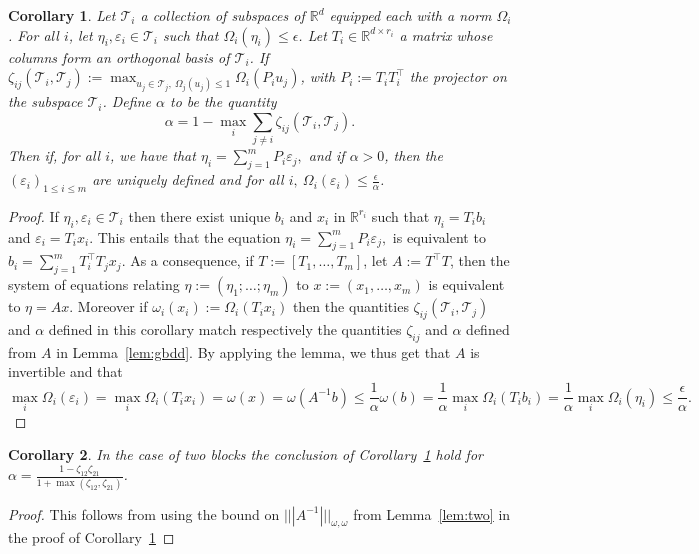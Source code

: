 \documentclass{article}
\def\RR{\mathbb{R}}
\def\T{\mathcal{T}}
\def\xxi{\zeta}
\newtheorem{cor}{Corollary}
\begin{document}
\begin{cor}
\label{cor:small_x}
Let $\T_i$ a collection of subspaces of $\RR^d$ equipped each with a norm $\Omega_i$. For all $i$, let $\eta_i,\varepsilon_i \in \T_i$ such that
$\Omega_i(\eta_i) \leq \epsilon$. Let $T_i \in \RR^{d \times r_i}$ a matrix whose columns form an orthogonal basis of $\T_i$.  If $\xxi_{ij}(\T_i,\T_j):=\max_{u_j \in \T_j,\: \Omega_j(u_j) \leq 1} \Omega_i(P_i u_j)$, with $P_i:=T_iT_i^\top$ the projector on the subspace $\T_i$. Define $\alpha$ to be the quantity
$$\alpha=1-\max_{i} \sum_{j\neq i} \xxi_{ij}(\T_i,\T_j).$$
Then if, for all $i$, we have that 
$\eta_i=\sum_{j=1}^m P_i\varepsilon_j,$
 and if $\alpha>0$, then the $(\varepsilon_i)_{1 \leq i \leq m}$ are uniquely defined and for all $i,\: \Omega_i(\varepsilon_i) \leq \frac{\epsilon}{\alpha}$.
\end{cor}
\begin{proof}
If $\eta_i, \varepsilon_i \in \T_i$ then there exist unique $b_i$ and $x_i$ in $\RR^{r_i}$ such that $\eta_i=T_i b_i$ and $\varepsilon_i=T_i x_i$.
This entails that the equation $\eta_i=\sum_{j=1}^m P_i\varepsilon_j,$ is equivalent to $b_i=\sum_{j=1}^m T_i^\top T_j x_j$. As a consequence,
if $T:=[T_1,\ldots,T_m]$, let $A:=T^\top T$, then the system of equations relating $\eta:=(\eta_1;\ldots;\eta_m)$ to $x:=(x_1,\ldots,x_m)$ is equivalent to $\eta=A x$.
Moreover if $\omega_i(x_i):=\Omega_i(T_i x_i)$ then the quantities $\xxi_{ij}(\T_i,\T_j)$ and $\alpha$ defined in this corollary match respectively the quantities $\xxi_{ij}$ and $\alpha$ defined from $A$ in Lemma~\ref{lem:gbdd}. By applying the lemma, we thus get that $A$ is invertible and that
$$\max_i\Omega_i(\varepsilon_i)=\max_i \Omega_i(T_i x_i)=\omega(x)=\omega(A^{-1}b)\leq \frac{1}{\alpha} \omega(b)= \frac{1}{\alpha} \max_{i} \Omega_i(T_i b_i)= \frac{1}{\alpha}\max_i\Omega_i(\eta_i) \leq  \frac{\epsilon}{\alpha}.$$
\end{proof}

\begin{cor}
\label{cor:small_x_two}
In the case of two blocks the conclusion of Corollary~\ref{cor:small_x} hold for $\alpha=\frac{1-\xxi_{12}\xxi_{21}}{1+\max(\xxi_{12},\xxi_{21})}$.
\end{cor}
\begin{proof}
This follows from using the bound on $|||A^{-1}|||_{\omega,\omega}$ from Lemma~\ref{lem:two} in the proof of Corollary~\ref{cor:small_x}
\end{proof}
\end{document}
